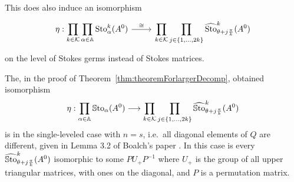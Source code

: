 \begin{cor}
  This does also induce an isomorphism
  \[ \begin{tikzcd}
    \eta:
    \displaystyle\prod_{k\in\cK}\prod_{\alpha\in\A}\Sto_{\alpha}^{k}(A^0)
    \rar{\cong}&
    \displaystyle\prod_{k\in\cK} \prod_{j\in\{1,\dots,2k\}}
      \hat\Sto_{\theta+j\frac{\pi}{k}}^k(A^0)
  \end{tikzcd} \]
  on the level of Stokes germs instead of Stokes matrices.
\end{cor}
\begin{rem}
  The, in the proof of Theorem~\ref{thm:theoremForlargerDecomp}, obtained
  isomorphism
  \[
    \eta: \prod_{\alpha\in\mathbb{A}}\operatorname{\mathbb{S}to}_{\alpha}(A^0) \longrightarrow
    \prod_{k\in\mathcal{K}} \prod_{j\in\{1,\dots,2k\}}
    \widehat{\operatorname{\mathbb{S}to}}_{\theta+j\frac{\pi}{k}}^k(A^0)
  \]
  is in the single-leveled case with $n=s$, i.e.\ all diagonal elements of
  $Q$ are different, given in Lemma 3.2 of Boalch's paper
  \cite[Lem.3.2]{boalch}.
  In this case is every $\widehat{\operatorname{\mathbb{S}to}}_{\theta+j\frac{\pi}{k}}^k(A^0)$ isomorphic
  to some $PU_+P^{-1}$ where $U_+$ is the group of all upper triangular
  matrices, with ones on the diagonal, and $P$ is a permutation matrix.
\end{rem}

